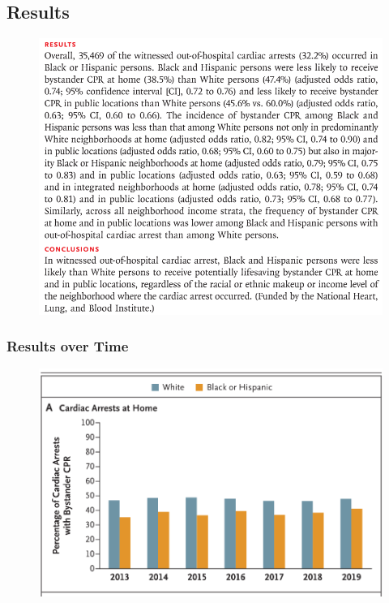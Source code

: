 \documentclass{beamer}
\begin{document}
	\subsection{Results}
		\begin{frame}
			\begin{figure}
					\centering
					\includegraphics[height=0.9\textheight, keepaspectratio]{img/results}
					\label{fig:results}
				\end{figure}
		\end{frame}
		\begin{frame}
			\frametitle{Results over Time}
			\begin{figure}
				\centering
				\includegraphics[height=0.6\linewidth]{img/fig1-part1}
				\label{fig:fig1-part1}
			\end{figure}
		\end{frame}
\end{document}
